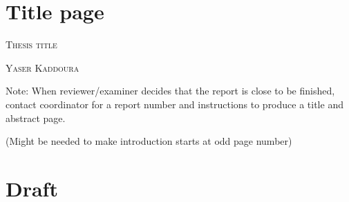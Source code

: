 \documentclass[a4paper, 12pt]{article}
\begin{document}

\thispagestyle{empty}
\section*{Title page}

\textsc{\large Thesis title }

\textsc{\large Yaser Kaddoura}

Note: When reviewer/examiner decides that the report is close to be finished,
contact coordinator for a report number and instructions to produce a title and
abstract page.

\newpage\null\thispagestyle{blank}\newpage

\thispagestyle{empty}


\newpage\null\thispagestyle{blank}\newpage

\tableofcontents

\newpage

\listoffigures

\newpage

\listoftables
\newpage




\newpage
\newpage\null(Might be needed to make introduction starts at odd page number)
\thispagestyle{blank}\newpage





\newpage

\printbibliography[heading=bibintoc, title={References}]

\newpage

\section{Draft}
\end{document}

